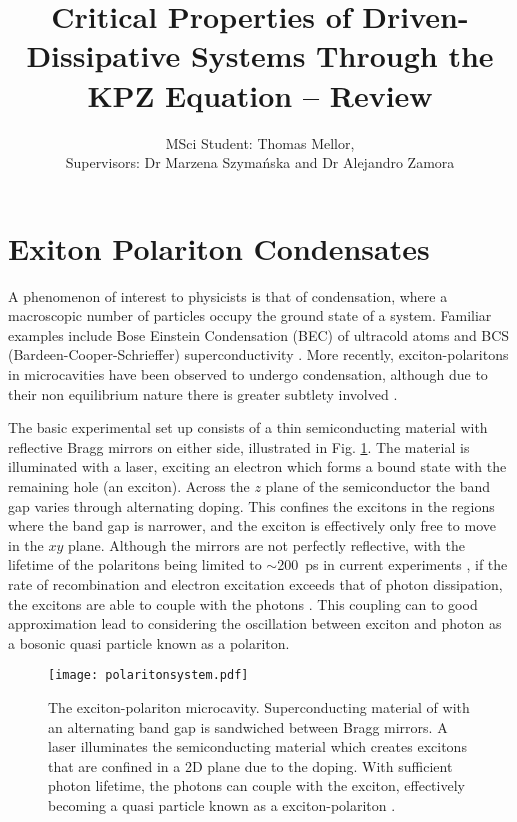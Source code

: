 \documentclass[letterpaper, 10 pt, conference]{IEEEtran}  %
\title{\LARGE \bf
Critical Properties of Driven-Dissipative Systems Through the KPZ Equation -- Review
}
\author{MSci Student: Thomas Mellor,

		Supervisors: Dr Marzena Szyma\'{n}ska and Dr Alejandro Zamora        
}
\newcommand{\fig}[1]{Fig. #1}
\begin{document}
\maketitle
\thispagestyle{empty}
\pagestyle{empty}





\section{Exiton Polariton Condensates}

A phenomenon of interest to physicists is that of condensation, where a macroscopic number of particles occupy the ground state of a system. 
Familiar examples include Bose Einstein Condensation (BEC) of ultracold atoms \cite{1674-1056-24-5-050507} and BCS (Bardeen-Cooper-Schrieffer) superconductivity \cite{PhysRev.108.1175}.
More recently, exciton-polaritons in microcavities have been observed to undergo condensation, although due to their non equilibrium nature there is greater subtlety involved \cite{Byrnes2014}.  

The basic experimental set up consists of a thin semiconducting material with reflective Bragg mirrors on either side, illustrated in \fig{\ref{fig:exciton-polariton}}.  
The material is illuminated with a laser, exciting an electron which forms a bound state with the remaining hole (an exciton). 
Across the $z$ plane of the semiconductor the band gap varies through alternating doping. 
This confines the excitons in the regions where the band gap is narrower, and the exciton is effectively only free to move in the $xy$ plane.
Although the mirrors are not perfectly reflective, with the lifetime of the polaritons being limited to $\sim$\SI{200}{\pico\second} in current experiments \cite{ 2014arXiv1408.1680S}, if the rate of recombination and electron excitation exceeds that of photon dissipation, the excitons are able to couple with the photons \cite{doi:10.1080/00107514.2010.550120}. 
This coupling can to good approximation lead to considering the oscillation between exciton and photon as a bosonic quasi particle known as a polariton.    

\begin{figure}[htbp!]
	\centering
	\texttt{[image: polaritonsystem.pdf]}
	\caption{The exciton-polariton microcavity.
	Superconducting material of with an alternating band gap is sandwiched between Bragg mirrors. 
	A laser illuminates the semiconducting material which creates excitons that are confined in a 2D plane due to the doping. 
	With sufficient photon lifetime, the photons can couple with the exciton, effectively becoming a quasi particle known as a exciton-polariton \cite{Byrnes2014}.}
	\label{fig:exciton-polariton}
\end{figure}
\end{document}
